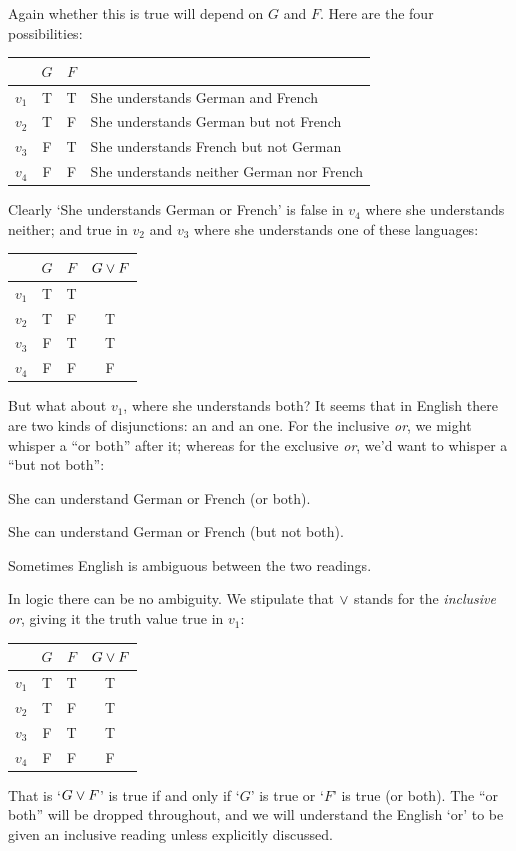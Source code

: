 Again whether this is true will depend on $G$ and $F$. Here are the four possibilities:
\begin{center}
	\begin{tabular}{rccl}
		&$G$&$F$\\\hline\Tstrut
		$v_1$&T&T&She understands German and French\\
		$v_2$&T&F&She understands German but not French\\
		$v_3$&F&T&She understands French but not German\\
		$v_4$&F&F&She understands neither German nor French\\
	\end{tabular}
\end{center}
Clearly `She understands German or French' is false in $v_4$ where she understands neither; and true in $v_2$ and $v_3$ where she understands one of these languages:
\begin{center}
	\begin{tabular}{rcc|c}
		&$G$&$F$&$G\vee F$\\\hline\Tstrut
		$v_1$&T&T&\\
		$v_2$&T&F&T\\
		$v_3$&F&T&T\\
		$v_4$&F&F&F
	\end{tabular}
\end{center}
But what about $v_1$, where she understands both? 
It seems that in English there are two kinds of disjunctions: an  and an  one. For the inclusive \emph{or}, we might whisper a ``or both'' after it; whereas for the exclusive \emph{or}, we'd want to whisper a ``but not both'':
\begin{samplesent}
	\item\label{sent:inclor} She can understand German or French (or both).
	\item\label{sent:exclor} She can understand German or French (but not both).
\end{samplesent}
Sometimes English is ambiguous between the two readings. 

In logic there can be no ambiguity. We stipulate that $\vee$ stands for the \emph{inclusive or}, giving it the truth value true in $v_1$:
\begin{center}
	\begin{tabular}{rcc|c}
		&$G$&$F$&$G\vee F$\\\hline
		$v_1$&T&T&T\\
		$v_2$&T&F&T\\
		$v_3$&F&T&T\\
		$v_4$&F&F&F
	\end{tabular}
\end{center}
That is `$G\vee F$' is true if and only if `$G$' is true or `$F$' is true (or both). The ``or both'' will be dropped throughout, and we will understand the English `or' to be given an inclusive reading unless explicitly discussed. 

